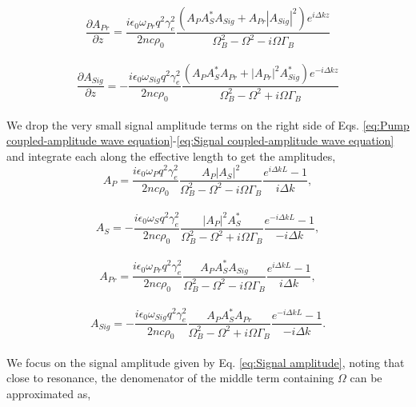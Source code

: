\documentclass[%
  reprint,
  superscriptaddress,
  amsmath,amssymb,
  aps,
  prapplied,
]{revtex4-2}
\begin{document}
\begin{equation}
    \frac{\partial A_{Pr}}{\partial z} = \frac{i\epsilon_{0}\omega_{Pr} q^{2}\gamma_{e}^{2}}{2nc\rho_{0}}\frac{(A_{P}A_{S}^{*}A_{Sig} + A_{Pr}|A_{Sig}|^{2})e^{i\Delta kz}}{\Omega_{B}^{2} - \Omega^{2} - i\Omega\Gamma_{B}}
\end{equation}
\\
\begin{equation}
    \frac{\partial A_{Sig}}{\partial z} = -\frac{i\epsilon_{0}\omega_{Sig} q^{2}\gamma_{e}^{2}}{2nc\rho_{0}}\frac{(A_{P}A_{S}^{*}A_{Pr} + |A_{Pr}|^{2}A_{Sig}^{*})e^{-i\Delta kz}}{\Omega_{B}^{2} - \Omega^{2} + i\Omega\Gamma_{B}}
    \label{eq:Signal coupled-amplitude wave equation}
\end{equation}
\\
We drop the very small signal amplitude terms on the right side of Eqs. \ref{eq:Pump coupled-amplitude wave equation}-\ref{eq:Signal coupled-amplitude wave equation} and integrate each along the effective length to get the amplitudes,
\\
\begin{equation}
  A_{P} = \frac{i\epsilon_{0}\omega_{P}q^{2}\gamma_{e}^{2}}{2nc\rho_{0}}\frac{A_{P}|A_{S}|^{2}}{\Omega_{B}^{2} - \Omega^{2} - i\Omega\Gamma_{B}} \frac{e^{i\Delta kL} - 1}{i\Delta k},
\end{equation}
\\
\begin{equation}
  A_{S} = -\frac{i\epsilon_{0}\omega_{S}q^{2}\gamma_{e}^{2}}{2nc\rho_{0}}\frac{|A_{P}|^{2}A_{S}^{*}}{\Omega_{B}^{2} - \Omega^{2} + i\Omega\Gamma_{B}} \frac{e^{-i\Delta kL} - 1}{-i\Delta k},
\end{equation}
\\
\begin{equation}
  A_{Pr} = \frac{i\epsilon_{0}\omega_{Pr}q^{2}\gamma_{e}^{2}}{2nc\rho_{0}}\frac{A_{P}A_{S}^{*}A_{Sig}}{\Omega_{B}^{2} - \Omega^{2} - i\Omega\Gamma_{B}} \frac{e^{i\Delta kL} - 1}{i\Delta k},
\end{equation}
\\
\begin{equation}
  A_{Sig} = -\frac{i\epsilon_{0}\omega_{Sig}q^{2}\gamma_{e}^{2}}{2nc\rho_{0}}\frac{A_{P}A_{S}^{*}A_{Pr}}{\Omega_{B}^{2} - \Omega^{2} + i\Omega\Gamma_{B}} \frac{e^{-i\Delta kL} - 1}{-i\Delta k}.
  \label{eq:Signal amplitude}
\end{equation}
\\
We focus on the signal amplitude given by Eq. \ref{eq:Signal amplitude}, noting that close to resonance, the denomenator of the middle term containing $\Omega$ can be approximated as,
\end{document}
